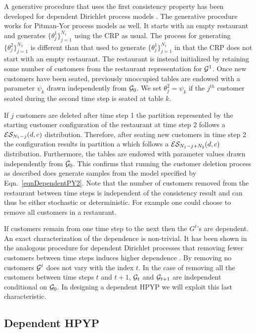 A generative procedure that uses the first consistency property has been developed for dependent Dirichlet process models \cite{Caron2007}.  The generative procedure works for Pitman-Yor process models as well. It starts with an empty restaurant and generates $\{ \theta_j^1\}_{j= 1}^{N_1}$ using the CRP as usual.  The process for generating $\{ \theta_j^2\}_{j= 1}^{N_2}$ is different than that used to generate $\{ \theta_j^1\}_{j= 1}^{N_1}$ in that the CRP does not start with an empty restaurant.  The restaurant is instead initialized by retaining some number of customers from the restaurant representation for $\G^1$.  Once new customers have been seated, previously unoccupied tables are endowed with a parameter $\psi_k$ drawn independently from $\G_0$.  We set $\theta^2_j = \psi_k$ if  the $j^{th}$ customer seated during the second time step is seated at table $k$. 

If $j$ customers are deleted after time step 1 the partition represented by the starting customer configuration of the restaurant at time step 2 follows a $\ES_{N_1- j}(d,c)$ distribution.  Therefore, after seating new customers in time step 2 the configuration results in partition a which follows a $\ES_{N_1 - j + N_2}(d,c)$ distribution. Furthermore, the tables are endowed with parameter values drawn independently from $\G_0$.  This confirms that running the customer deletion process as described does generate samples from the model specified by Eqn.~\ref{eqnDependentPY2}. Note that the number of customers removed from the restaurant between time steps is independent of the consistency result and can thus be either stochastic or deterministic. For example one could choose to remove all customers in a restaurant.

If customers remain from one time step to the next then the $G^t$'s are dependent.  An exact characterization of the dependence is non-trivial.   It has been shown in the analogous procedure for dependent Dirichlet processes that removing fewer customers between time steps induces higher dependence \cite{Caron2007}.  By removing no customers $\G^t$ does not vary with the index $t$.  In the case of removing all the customers between time steps $t$ and $t+1$,  $\G_t$ and $\G_{t+1}$ are independent conditional on $\G_0$.  In designing a dependent HPYP we will exploit this last characteristic.

\subsection{Dependent HPYP}
\label{sec:dhpyp}


